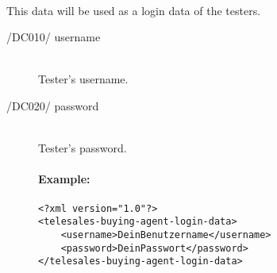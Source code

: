 \paragraph{}This data will be used as a login data of the testers.
\begin{description}
\item[/DC010/ username]\hfill\\ Tester's username.
\item[/DC020/ password]\hfill\\ Tester's password.

\paragraph{Example:}
\begin{verbatim}
<?xml version="1.0"?>
<telesales-buying-agent-login-data>
    <username>DeinBenutzername</username>
    <password>DeinPasswort</password>
</telesales-buying-agent-login-data>
\end{verbatim}
\end{description}
